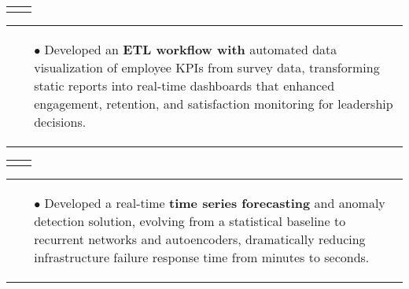 \documentclass[11pt,a4paper,sans,english]{moderncv}
\makeatletter
\renewcommand*{\cventry}[6][.25em]{%
	\vspace{1.5mm}%
	\begin{tabular*}{\textwidth}{@{\extracolsep{\fill}}ll}%
		\ifthenelse{\equal{#3}{}}{}{\textbf{#3}} &
		\ifthenelse{\equal{#2}{}}{}{#4 #6 #2}\\%
	\end{tabular*}%
	\par\addvspace{#1}}
\newcommand*{\mycvitem}[2][.25em]{%
	\vspace{-.25em}%
	\begin{tabular}{@{}p{\textwidth}@{}}%
		\small#2%
	\end{tabular}%
	\par\addvspace{-0.7em}}
\newcommand*{\cvtag}[1]{%
	\textcolor{lightgray!50!black}{\fbox{\mathstrut\scriptsize\textsf{\textbf{#1}}}}}
\makeatother
\begin{document}
	\cventry{\scalebox{0.9}{\faCalendar\ 10/2022--02/2023}}{Artificial Intelligence and Data - Analyst}{\scalebox{0.9}{\faBuilding\ \href{https://www2.deloitte.com}{\textit{Deloitte}}}}{}{\scalebox{0.9}{\faMapMarker\ Bari}}{}
	\mycvitem{%
		\vspace*{-.6cm}
		\begin{flushleft}
			\noindent
			\cvtag{Qlik Sense} \cvtag{SQL} \cvtag{Pandas} \cvtag{MS Excel} \cvtag{Qlik NPrinting}
		\end{flushleft}
		\vspace*{-.2cm}
		\begin{itemize}
			\item[$\bullet$] Developed an \textbf{ETL workflow with} automated data visualization of employee KPIs from survey data, transforming static reports into real-time dashboards that enhanced engagement, retention, and satisfaction monitoring for leadership decisions.
	\end{itemize}}
	
	\vspace*{.25cm}
	\cventry{\scalebox{0.9}{\faCalendar\ 12/2021--05/2022}}{AI engineer and System Administrator - Intern}{\scalebox{0.9}{\faBuilding\ \href{https://www.intesasanpaolo.com/}{\textit{Intesa Sanpaolo}}}}{}{\scalebox{0.9}{\faMapMarker\ Torino}}{}
	\mycvitem{%
		\vspace*{-.6cm}
		\begin{flushleft}
			\noindent
			\cvtag{Python} \cvtag{TensorFlow} \cvtag{Google Cloud Platform} \cvtag{Flask} \cvtag{Bokeh} \cvtag{Bash}
		\end{flushleft}
		\vspace*{-.2cm}
		\begin{itemize}
			\item[$\bullet$] Developed a real-time \textbf{time series forecasting} and anomaly detection solution, evolving from a statistical baseline to recurrent networks and autoencoders, dramatically reducing infrastructure failure response time from minutes to seconds.
	\end{itemize}}
	
\end{document}
